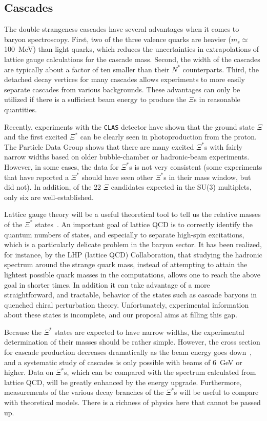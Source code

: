 \subsection{Cascades}

The double-strangeness cascades have several advantages when it comes to 
baryon spectroscopy.  First, two of the three valence quarks are heavier 
($m_s \simeq$ 100~MeV) than light quarks, which reduces the uncertainties 
in extrapolations of lattice gauge calculations for the cascade mass.  
Second, the width of the cascades are typically about a factor of ten 
smaller than their $N^*$ counterparts.  Third, the detached decay vertices 
for many cascades allows experiments to more easily separate cascades 
from various backgrounds.  These advantages can only be utilized if there 
is a sufficient beam energy to produce the $\Xi$s in reasonable quantities.

Recently, experiments with the {\tt CLAS} detector have shown that the 
ground state $\Xi$ and the first excited $\Xi^*$ can be clearly seen
\cite{Pri04} in photoproduction from the proton.  The Particle Data Group
\cite{pdg} shows that there are many excited $\Xi^*$s with fairly narrow 
widths based on older bubble-chamber or hadronic-beam experiments.  However, 
in some cases, the data for $\Xi^*$s is not very consistent (some experiments 
that have reported a $\Xi^*$ should have seen other $\Xi^*$s in their mass 
window, but did not).  In addition, of the 22 $\Xi$ candidates expected in 
the SU(3) multiplets, only six are well-established.

Lattice gauge theory will be a useful theoretical tool to tell us the 
relative masses of the $\Xi^*$ states~\cite{jlab-lat1,jlab-lat2,jlab-lat3}.  
An important goal of lattice QCD is to correctly identify the quantum numbers 
of states, and especially to separate high-spin excitations, which is a 
particularly delicate problem in the baryon sector. It has been realized, for 
instance, by the LHP (lattice QCD) Collaboration, that studying the 
hadronic spectrum around the strange quark mass, instead of attempting to 
attain the lightest possible quark masses in the computations, allows one 
to reach the above goal in shorter times.  In addition it can take advantage 
of a more straightforward, and tractable, behavior of the states such as 
cascade baryons in quenched chiral perturbation theory. Unfortunately,
experimental information about these states is incomplete, and our
proposal aims at filling this gap.

Because the $\Xi^*$ states are expected to have narrow widths, the
experimental determination of their masses should be rather simple.
However, the cross section for cascade production decreases dramatically 
as the beam energy goes down~\cite{eg3}, and a systematic study of cascades 
is only possible with beams of 6~GeV or higher.  Data on $\Xi^*$s, which 
can be compared with the spectrum calculated from lattice QCD, will be 
greatly enhanced by the energy upgrade.  Furthermore, measurements of the 
various decay branches of the $\Xi^*$s will be useful to compare with 
theoretical models.  There is a richness of physics here that cannot be 
passed up.
 
